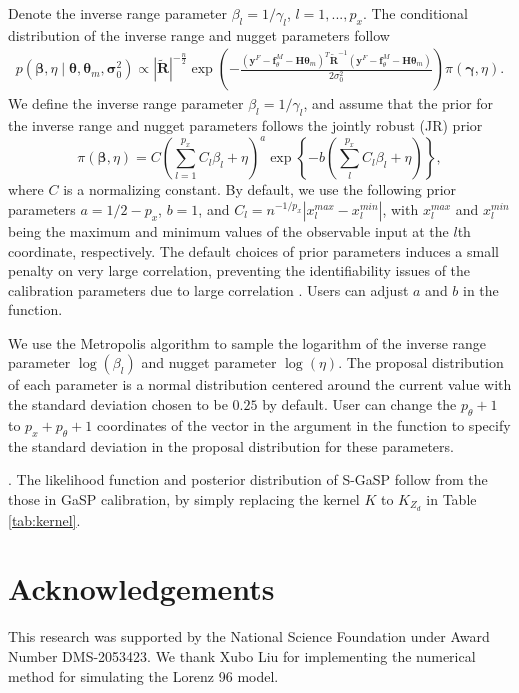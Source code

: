 Denote the inverse range parameter $\beta_l=1/\gamma_l$, $l=1,...,p_x$. The conditional distribution of the inverse range and nugget parameters follow 
\begin{align*}
p(\bm \beta, \eta \mid  \bm \theta, \bm \theta_m, \bm \sigma^{2}_0 )\propto |\mathbf { \tilde R}|^{-\frac{n}{2}} \exp\left( - \frac{(\mathbf y^F-\mathbf f^M_{\theta}- \mathbf H \bm \theta_m )^T \mathbf { \tilde R}^{-1}(\mathbf y^F-\mathbf f^M_{\theta}- \mathbf H \bm \theta_m )  }{2\sigma^2_0}\right)\pi(\bm \gamma, \eta).
\end{align*}
We define the inverse range parameter $\beta_l=1/\gamma_l$, and assume that the prior for the inverse range and nugget parameters follows the jointly robust (JR) prior \citep{gu2019jointly}
\[\pi(\bm \beta, \eta)=C\left( \sum^{p_x}_{l=1} C_l \beta_l+\eta \right)^a \exp\left\{-b \left( \sum^{p_x}_l C_l \beta_l+\eta \right) \right\}, \]
where $C$ is a normalizing constant. By default, we use the following prior parameters $a=1/2-p_x$, $b=1$, and  $C_l= n^{-1/{p_x}}|x^{max}_{l}-x^{min}_{l}| $, with $x^{max}_{l}$ and $x^{min}_{l}$ being the maximum and minimum values of the observable input at the $l$th coordinate, respectively.  %
The default choices of prior parameters induces a small penalty on very large correlation, preventing the identifiability issues of the calibration parameters due to large correlation  \citep{gu2019jointly}. Users can adjust $a$ and $b$ in the  function.

We  use the Metropolis algorithm to sample the logarithm of the inverse range parameter $\log( \beta_l)$ and nugget parameter $\log(\eta)$. 
The proposal distribution of each parameter is a normal distribution  centered around the current value  with the standard deviation chosen to be $0.25$ by default. User can change the $p_{\theta}+1$ to  $p_x+p_{\theta}+1$ coordinates of the vector in the argument   in the  function to specify the standard deviation in the proposal distribution for these parameters.  


. The likelihood function and posterior distribution of  S-GaSP follow from the those in GaSP calibration, by simply replacing the kernel $K$ to $K_{Z_d}$ in Table \ref{tab:kernel}. 




\section*{Acknowledgements}  
This research was supported by the National Science Foundation under Award Number DMS-2053423. We thank Xubo Liu for implementing the numerical method for simulating the Lorenz 96 model.







\address{
  Mengyang Gu\\
    University of California, Santa Barbara\\
  Department of Statistics and Applied Probability\\
  Santa Barbara, California, USA\\
   }
